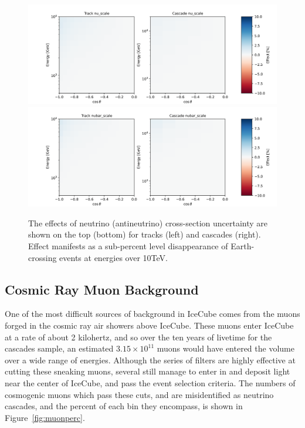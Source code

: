 \documentclass[main.tex]{subfiles}
\begin{document}
\begin{figure}
    \centering
    \includegraphics[width=0.7\linewidth]{figures/systematics/nu_scale.png} \\
    \includegraphics[width=0.7\linewidth]{figures/systematics/nubar_scale.png}
    \caption{The effects of neutrino (antineutrino) cross-section uncertainty are shown on the top (bottom) for tracks (left) and cascades (right). Effect manifests as a sub-percent level disappearance of Earth-crossing events at energies over 10TeV.}\label{fig:nucross}
\end{figure}


\subsection{Cosmic Ray Muon Background}\label{sec:cr_muon}

One of the most difficult sources of background in IceCube comes from the muons forged in the cosmic ray air showers above IceCube. 
These muons enter IceCube at a rate of about 2 kilohertz, and so over the ten years of livetime for the cascades sample, an estimated $3.15\times 10^{11}$ muons would have entered the volume over a wide range of energies. 
Although the series of filters are highly effective at cutting these sneaking muons, several still manage to enter in and deposit light near the center of IceCube, and pass the event selection criteria. 
The numbers of cosmogenic muons which pass these cuts, and are misidentified as neutrino cascades, and the percent of each bin they encompass, is shown in Figure~\ref{fig:muonperc}.
\end{document}
